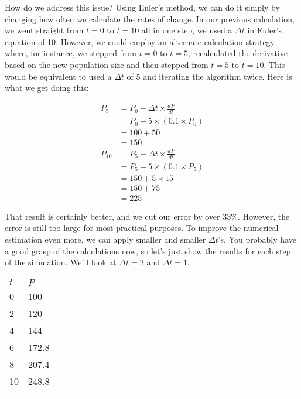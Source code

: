 \documentclass[]{memoir}
\begin{document}
How do we address this issue? Using Euler's method, we can do it simply
by changing how often we calculate the rates of change. In our previous
calculation, we went straight from $t=0$ to $t=10$ all in one step, we
used a $\Delta t$ in Euler's equation of 10. However, we could employ an
alternate calculation strategy where, for instance, we stepped from
$t=0$ to $t=5$, recalculated the derivative based on the new population
size and then stepped from $t=5$ to $t=10$. This would be equivalent to
used a $\Delta t$ of 5 and iterating the algorithm twice. Here is what
we get doing this:

\[
\begin{aligned}
P_{5} &= P_0 + \Delta t \times \frac{dP}{dt} \\
&= P_0 + 5 \times (0.1 \times P_0) \\
&= 100 + 50 \\
&= 150 \\
P_{10} &= P_5 + \Delta t \times \frac{dP}{dt} \\
&= P_5 + 5 \times (0.1 \times P_5) \\
&= 150 + 5 \times 15 \\
&= 150 + 75 \\
&= 225
\end{aligned}
\]

That result is certainly better, and we cut our error by over 33\%.
However, the error is still too large for most practical purposes. To
improve the numerical estimation even more, we can apply smaller and
smaller $\Delta t$'s. You probably have a good grasp of the calculations
now, so let's just show the results for each step of the simulation.
We'll look at $\Delta t = 2$ and $\Delta t = 1$.

\begin{longtable}[c]{@{}ll@{}}
\hline\noalign{\medskip}
$t$ & $P$
\\\noalign{\medskip}
\hline\noalign{\medskip}
0 & 100
\\\noalign{\medskip}
2 & 120
\\\noalign{\medskip}
4 & 144
\\\noalign{\medskip}
6 & 172.8
\\\noalign{\medskip}
8 & 207.4
\\\noalign{\medskip}
10 & 248.8
\\\noalign{\medskip}
\hline
\end{longtable}
\end{document}
